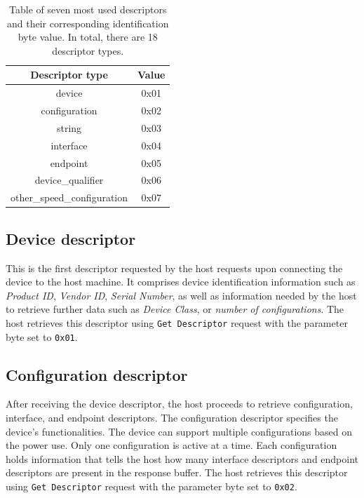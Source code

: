 \begin{table}[ht]
    \centering
    \begin{tabular}{|c|c|} \hline
        \textbf{Descriptor type} & \textbf{Value} \\ \hline
                          device & 0x01           \\ \hline
                   configuration & 0x02           \\ \hline
                          string & 0x03           \\ \hline
                       interface & 0x04           \\ \hline
                        endpoint & 0x05           \\ \hline
               device\_qualifier & 0x06           \\ \hline
     other\_speed\_configuration & 0x07           \\ \hline

    \end{tabular}
    \caption{Table of seven most used descriptors and their corresponding identification byte value. In total, there are 18 descriptor types.}
    \label{tab:descriptor_table}
\end{table}

\subsection*{Device descriptor}
This is the first descriptor requested by the host requests upon connecting the device to the host machine. It comprises device identification information such as \emph{Product ID}, \emph{Vendor ID}, \emph{Serial Number}, as well as information needed by the host to retrieve further data such as \emph{Device Class}, or \emph{number of configurations}. The host retrieves this descriptor using \verb|Get Descriptor| request with the parameter byte set to \verb|0x01|.

\subsection*{Configuration descriptor}
After receiving the device descriptor, the host proceeds to retrieve configuration, interface, and endpoint descriptors. The configuration descriptor specifies the device's functionalities. The device can support multiple configurations based on the power use. Only one configuration is active at a time. Each configuration holds information that tells the host how many interface descriptors and endpoint descriptors are present in the response buffer. The host retrieves this descriptor using \verb|Get Descriptor| request with the parameter byte set to \verb|0x02|.

